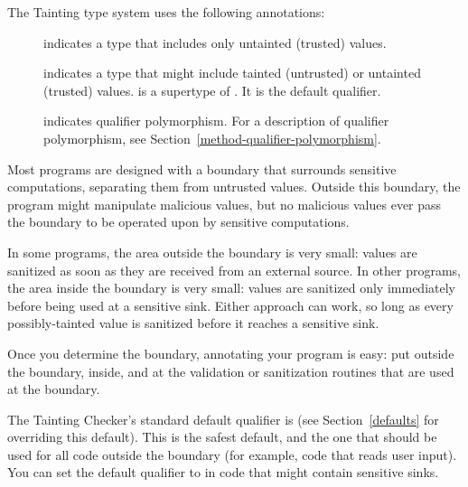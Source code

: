 The Tainting type system uses the following annotations:
\begin{description}
\item[]
  indicates
  a type that includes only untainted (trusted) values.
\item[]
  indicates
  a type that might include tainted (untrusted) or untainted (trusted) values.
   is a supertype of .
  It is the default qualifier.
\item[]
  indicates qualifier polymorphism.
  For a description of qualifier polymorphism, see
  Section~\ref{method-qualifier-polymorphism}.
\end{description}



Most programs are designed with a boundary that surrounds sensitive
computations, separating them from untrusted values.  Outside this
boundary, the program might manipulate malicious values, but no malicious
values ever pass the boundary to be operated upon by sensitive
computations.

In some programs, the area outside the boundary is very small:  values are
sanitized as soon as they are received from an external source.  In other
programs, the area inside the boundary is very small:  values are sanitized
only immediately before being used at a sensitive sink.  Either approach
can work, so long as every possibly-tainted value is sanitized before it
reaches a sensitive sink.

Once you determine the boundary, annotating your program is easy:  put
 outside the boundary,  inside, and
 at the validation or
sanitization routines that are used at the boundary.

The Tainting Checker's standard default qualifier is  (see
Section~\ref{defaults} for overriding this default).  This is the safest
default, and the one that should be used for all code outside the boundary
(for example, code that reads user input).  You can set the default
qualifier to  in code that might contain sensitive sinks.

